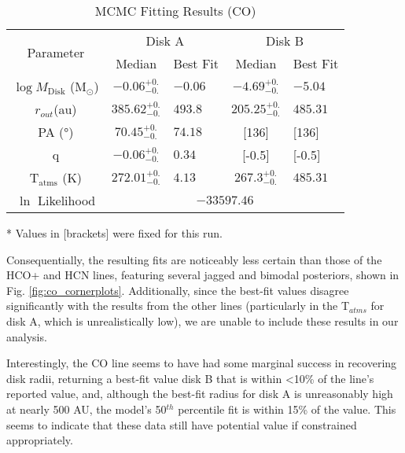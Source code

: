 \begin{table}[h!]
  \centering
  \begin{threeparttable}
    \caption{MCMC Fitting Results (CO)}
    \label{table:fit_co}
    \renewcommand{\arraystretch}{1.2}
    \begin{tabular}{c c l c l }
      \toprule \toprule
      \multirow{2}{*}{Parameter} & \multicolumn{2}{c}{Disk A} & \multicolumn{2}{c}{Disk B} \\
                                 & Median & Best Fit          & Median & Best Fit \\
      \midrule %
      $\log M_\text{Disk}$ (M$_\odot$) & $ -0.06_{-0.}^{+0.}$ & $-0.06$    & $ -4.69_{-0.} ^{+0.}$ & $-5.04$ \\
      $r_{out}$(\si{au})               & $ 385.62_{-0.}^{+0.}$ & $493.8$    & $ 205.25_{-0.} ^{+0.}$  & $485.31$    \\
      PA  (\si{\degree})               & $ 70.45_{-0.}^{+0.}$ & $74.18$  & [136]  & [136]  \\
      q                                & $ -0.06_{-0.} ^{+0.}$ & $0.34$  & [-0.5]  & [-0.5]  \\
      T$_\text{atms}$ (K)              & $ 272.01_{-0.} ^{+0.}$ & $4.13 $  & $ 267.3_{-0.}^{+0.}$  & $485.31$  \\
      $\ln$ Likelihood          & \multicolumn{4}{c}{$-33597.46$} \\
      \bottomrule
    \end{tabular}

    \begin{tablenotes}\footnotesize
      \item[*] Values in [brackets] were fixed for this run.
    \end{tablenotes}
  \end{threeparttable}
\end{table}

Consequentially, the resulting fits are noticeably less certain than those of the HCO+ and HCN lines, featuring several jagged and bimodal posteriors, shown in Fig. \ref{fig:co_cornerplots}. Additionally, since the best-fit values disagree significantly with the results from the other lines (particularly in the T$_{atms}$ for disk A, which is unrealistically low), we are unable to include these results in our analysis.

Interestingly, the CO line seems to have had some marginal success in recovering disk radii, returning a best-fit value disk B that is within \textless10\% of the \hco line's reported value, and, although the best-fit radius for disk A is unreasonably high at nearly 500 AU, the model's 50$^{th}$ percentile fit is within 15\% of the \hco value. This seems to indicate that these data still have potential value if constrained appropriately.









